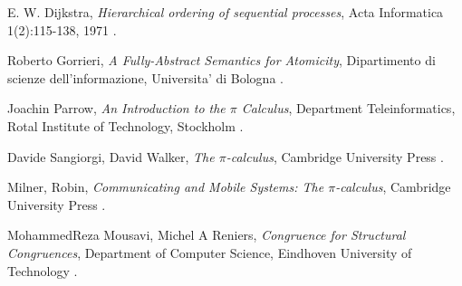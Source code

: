 \begin{thebibliography}{99}

  E. W. Dijkstra,
  \emph{Hierarchical ordering of sequential processes},
  Acta Informatica 1(2):115-138, 
  1971
  .


  Roberto Gorrieri,
  \emph{A Fully-Abstract Semantics for Atomicity},
  Dipartimento di scienze dell'informazione, 
  Universita' di Bologna
  .


  Joachin Parrow, 
  \emph{An Introduction to the $\pi$ Calculus},
  Department Teleinformatics,
  Rotal Institute of Technology,
  Stockholm
  .


  Davide Sangiorgi, David Walker,
  \emph{The $\pi$-calculus},
  Cambridge University Press
  .


  Milner, Robin, 
  \emph{Communicating and Mobile Systems: The $\pi$-calculus},
  Cambridge University Press
  .

  MohammedReza Mousavi, Michel A Reniers,
  \emph{Congruence for Structural Congruences},
  Department of Computer Science,
  Eindhoven University of Technology
  .


\end{thebibliography}
